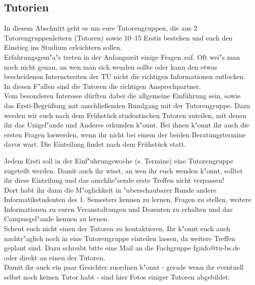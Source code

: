 \subsection{Tutorien}



In diesem Abschnitt geht es um eure Tutorengruppen, die aus 2 Tutorengruppenleitern (Tutoren) sowie 10--15 Erstis bestehen und euch den Einstieg ins Studium erleichtern sollen.\\
Erfahrungsgem"a"s treten in der Anfangszeit einige Fragen auf. Oft wei"s man noch nicht genau, an wen man sich wenden sollte oder kann den etwas bescheidenen Internetseiten der TU nicht die richtigen Informationen entlocken. In diesen F"allen sind die Tutoren die richtigen Ansprechpartner.\\

Vom besonderen Interesse dürften dabei die allgemeine Einführung sein,
sowie das Ersti-Begrüßung mit anschließenden Rundgang mit der
Tutorengruppe.
Dazu werden wir euch nach dem Frühstück studentischen 
Tutoren zuteilen, mit denen ihr das Unigel"ande und Anderes erkunden 
k"onnt. Bei ihnen k"onnt ihr auch die ersten Fragen loswerden, wenn 
ihr nicht bei einem der beiden Beratungstermine davor wart.
Die Einteilung findet nach dem Frühstück statt.

Jedem Ersti soll in der Einf"uhrungswoche (s. Termine) eine Tutorengruppe zugeteilt werden. Damit auch ihr wisst, an wen ihr euch wenden k"onnt, solltet ihr diese Einteilung und das anschlie"sende erste Treffen nicht verpassen!\\
Dort habt ihr dann die M"oglichkeit in "uberschaubarer Runde andere Informatikstudenten des 1. Semesters kennen zu lernen, Fragen zu stellen, weitere Informationen zu euren Veranstaltungen und Dozenten zu erhalten und das Campusgel"ande kennen zu lernen.\\
Scheut euch nicht einen der Tutoren zu kontaktieren. Ihr k"onnt euch auch nachtr"aglich noch in eine Tutorengruppe einteilen lassen, da weitere Treffen geplant sind. Dazu schreibt bitte eine Mail an die Fachgruppe fginfo@tu-bs.de oder direkt an einen der Tutoren.\\
Damit ihr auch ein paar Gesichter zuordnen k"onnt - gerade wenn ihr eventuell selbst noch keinen Tutor habt - sind hier Fotos einiger Tutoren abgebildet:

